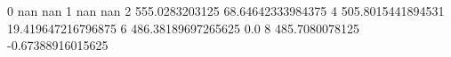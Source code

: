 0 nan nan
1 nan nan
2 555.0283203125 68.64642333984375
4 505.8015441894531 19.419647216796875
6 486.38189697265625 0.0
8 485.7080078125 -0.67388916015625
